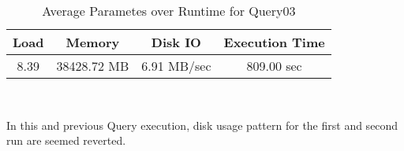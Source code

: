 \documentclass[../../main.tex]{subfiles}
\begin{document}
\begin{minipage}{.5\textwidth}
    \end{minipage}
    \begin{table}
        \begin{center}
            \begin{tabular}{ |c|c|c|c| } 
            \hline
            Load & Memory & Disk IO & Execution Time\\
            \hline
            8.39 & 38428.72 MB & 6.91 MB/sec & 809.00 sec \\
            \hline
            \end{tabular}
            \\[1pt]
            \caption{Average Parametes over Runtime for Query03}
        \end{center}
    \end{table}
    In this and previous Query execution, disk usage pattern for the first and second run are seemed reverted.
    \pagebreak
\end{document}
